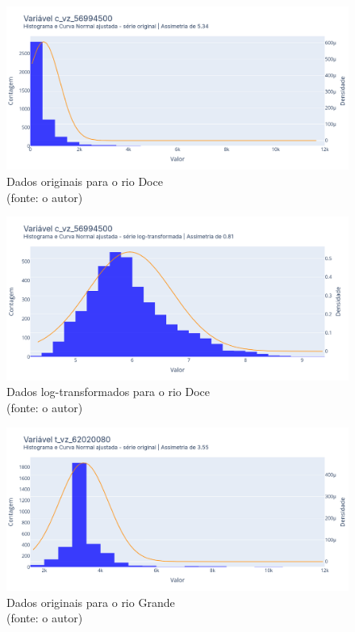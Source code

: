 \begin{figure}[!h]
	\centering
	\includegraphics[scale=0.33]{Figuras/rio_doce/rio_doce_antes_log.png}
	\caption{Dados originais para o rio Doce\\(fonte: o autor)}
	\label{fig:rio_doce_antes_log}
\end{figure}

\begin{figure}[!h]
	\centering
	\includegraphics[scale=0.33]{Figuras/rio_doce/rio_doce_depois_log.png}
	\caption{Dados log-transformados para o rio Doce\\(fonte: o autor)}
	\label{fig:rio_doce_depois_log}
\end{figure}

\begin{figure}[!h]
	\centering
	\includegraphics[scale=0.33]{Figuras/rio_grande/rio_grande_antes_log.png}
	\caption{Dados originais para o rio Grande\\(fonte: o autor)}
	\label{fig:rio_grande_antes_log}
\end{figure}


